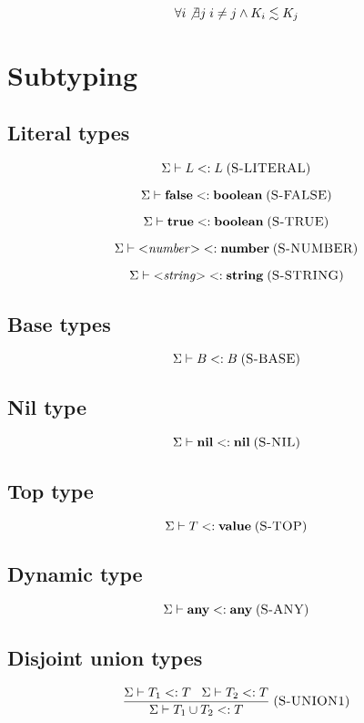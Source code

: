 \documentclass[12pt]{article}
\newcommand{\Top}{\mathbf{value}}
\newcommand{\Any}{\mathbf{any}}
\newcommand{\Nil}{\mathbf{nil}}
\newcommand{\False}{\mathbf{false}}
\newcommand{\True}{\mathbf{true}}
\newcommand{\Boolean}{\mathbf{boolean}}
\newcommand{\Number}{\mathbf{number}}
\newcommand{\String}{\mathbf{string}}
\newcommand{\mylabel}[1]{\; (\textsc{#1})}
\newcommand{\subtype}{<:}
\newcommand{\senv}{\Sigma}
\begin{document}
\[
\forall i \not\exists j \; i \not= j \wedge K_{i} \lesssim K_{j}
\]

\section{Subtyping}

\subsection{Literal types}

\[
\senv \vdash L \subtype L
\mylabel{S-LITERAL}
\]

\[
\senv \vdash \False \subtype \Boolean
\mylabel{S-FALSE}
\]

\[
\senv \vdash \True \subtype \Boolean
\mylabel{S-TRUE}
\]

\[
\senv \vdash {<}{\it number}{>} \subtype \Number
\mylabel{S-NUMBER}
\]

\[
\senv \vdash {<}{\it string}{>} \subtype \String
\mylabel{S-STRING}
\]

\subsection{Base types}

\[
\senv \vdash B \subtype B
\mylabel{S-BASE}
\]

\subsection{Nil type}

\[
\senv \vdash \Nil \subtype \Nil
\mylabel{S-NIL}
\]

\subsection{Top type}

\[
\senv \vdash T \subtype \Top
\mylabel{S-TOP}
\]

\subsection{Dynamic type}

\[
\senv \vdash \Any \subtype \Any
\mylabel{S-ANY}
\]

\subsection{Disjoint union types}

\[
\frac{\senv \vdash T_{1} \subtype T \;\;\;
      \senv \vdash T_{2} \subtype T}
     {\senv \vdash T_{1} \cup T_{2} \subtype T}
\mylabel{S-UNION1}
\]
\end{document}
